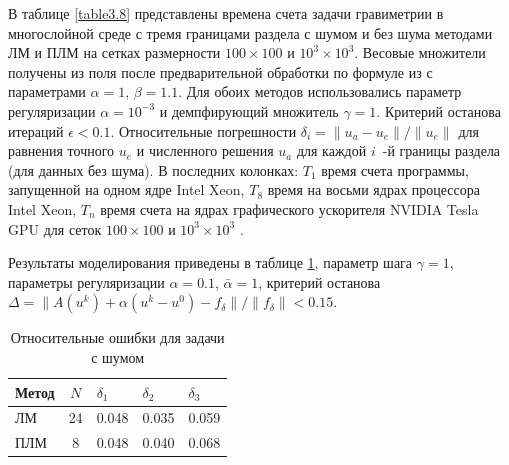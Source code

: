 В таблице \ref{table3.8} представлены времена счета задачи гравиметрии в многослойной среде с тремя границами раздела с шумом и без шума методами ЛМ и ПЛМ на сетках размерности $100\times100$ и $10^3\times10^3$. Весовые множители получены из поля после предварительной обработки по формуле из  \cite{AkMarMis2013} с параметрами $\alpha=1$, $\beta=1.1$.  Для обоих методов использовались параметр регуляризации $\alpha=10^{-3}$ и демпфирующий множитель $\gamma=1$. Критерий останова итераций $\epsilon < 0.1$. Относительные погрешности $\delta_i=\|u_a-u_e\|/\|u_e\|$ для равнения точного $u_e$ и численного решения $u_a$ для каждой $i$~-й границы раздела (для данных без шума). В последних колонках: $T_1 $ время счета программы, запущенной на одном ядре Intel Xeon, $T_8$ время на восьми ядрах процессора Intel Xeon, $T_n$ время счета на ядрах графического ускорителя NVIDIA Tesla GPU для сеток $100\times100$ и $10^3\times10^3$ . 

Результаты моделирования приведены в таблице \ref{table3.9}, параметр шага $\gamma=1$, параметры регуляризации $\alpha=0.1$, $\bar{\alpha}=1$, критерий останова $\Delta=\|A(u^k)+\alpha(u^k-u^0)-f_\delta\|/\|f_\delta\|<0.15$.
\begin{table}[]
	\centering
	\caption{Относительные ошибки для задачи с шумом}
	\label{table3.9}
	\begin{tabular}{|l|c|l|l|l|}
		\hline
		\textbf{Метод} & \textbf{$N$} & \textbf{$\delta_1$} & \textbf{$\delta_2$} & \textbf{$\delta_3$} \\ \hline
		ЛМ                                                    & 24                            & 0.048                                & 0.035                                & 0.059                                \\ \hline
		ПЛМ                                                   & 8                             & 0.048                                & 0.040                                & 0.068                                \\ \hline
	\end{tabular}
\end{table}

